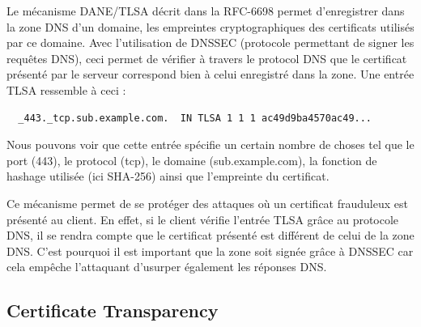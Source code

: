 Le mécanisme DANE/TLSA décrit dans la RFC-6698 permet d'enregistrer dans la zone DNS d'un domaine, les empreintes cryptographiques des certificats utilisés par ce domaine. Avec l'utilisation de DNSSEC (protocole permettant de signer les requêtes DNS), ceci permet de vérifier à travers le protocol DNS que le certificat présenté par le serveur correspond bien à celui enregistré dans la zone. Une entrée TLSA ressemble à ceci :

\begin{verbatim}
  _443._tcp.sub.example.com.  IN TLSA 1 1 1 ac49d9ba4570ac49...
\end{verbatim}

Nous pouvons voir que cette entrée spécifie un certain nombre de choses tel que le port (443), le protocol (tcp), le domaine (sub.example.com), la fonction de hashage utilisée (ici SHA-256) ainsi que l'empreinte du certificat.

Ce mécanisme permet de se protéger des attaques où un certificat frauduleux est présenté au client. En effet, si le client vérifie l'entrée TLSA grâce au protocole DNS, il se rendra compte que le certificat présenté est différent de celui de la zone DNS. C'est pourquoi il est important que la zone soit signée grâce à DNSSEC car cela empêche l'attaquant d'usurper également les réponses DNS.

\subsection{Certificate Transparency}
